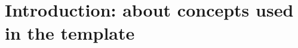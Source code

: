\section*{Introduction: about concepts used in the template}


\begin{comment}

!!! SEE THE FOLLOWING !!!
!!!
https://journals.ieeeauthorcenter.ieee.org/wp-content/uploads/sites/7/IEEE_Reference_Guide.pdf
https://journals.ieeeauthorcenter.ieee.org/wp-content/uploads/sites/7/IEEE-Editorial-Style-Manual-for-Authors.pdf
!!!

In the template, we use a number of concepts that it is important to be clear about what they mean and how they relate to each other.
We illustrate this with examples.
You may have received your thesis as an assignment from a company, for example.
In this case, you will often have been given a problem that the company is experiencing and that you should try to find a solution to. 
In this case, the problem forms the background to the aim of the work and the question you are working on.

Example: company X has a system that they want to be able to use in a real-time application, but the performance of the system is unknown. 
The problem is then: the performance of the system is unknown.
The solution to the problem is to measure performance.
The purpose of your work will be to map the performance of the system so that you have a measure of this. 
The question can be formulated as: What is the performance of the system? The motivation for the work is that it is important to know the performance when the system is used for real-time applications.
Once you have the purpose and the question, you formulate the objectives that you want to achieve with the work, in this case the objectives could be to measure a number of different aspects of performance. 
Together, these objectives will then fulfil the purpose. 
However, your thesis does not have to be formulated as a specific problem to be solved.
Other examples of work that may appear as a thesis include:


\end{comment}
